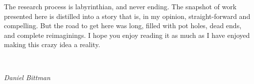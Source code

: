 \chendsep

The research process is labyrinthian, and never ending.
The snapshot of work presented here is distilled into a story that is, in my opinion, straight-forward and compelling. But the
road to get here was long, filled with pot holes, dead ends, and complete reimaginings. I hope you enjoy reading it as
much as I have enjoyed making this crazy idea a reality.

\begin{center}
    \heart \,
    \heart \,
    \heart \,
\end{center}

{
\hfill \emph{Daniel Bittman}
}
\endgroup

